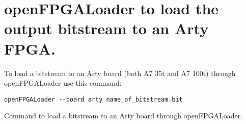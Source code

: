 \section{openFPGALoader to load the output bitstream to an Arty FPGA.}

\label{ofl}

To load a bitstream to an Arty board (both A7 35t and A7 100t) through openFPGALoader use this command: 

\begin{code}
\begin{verbatim}
openFPGALoader --board arty name_of_bitstream.bit
\end{verbatim}
\caption{Command to load a bitstream to an Arty board through openFPGALoader.}
\label{cod:7}
\end{code}



